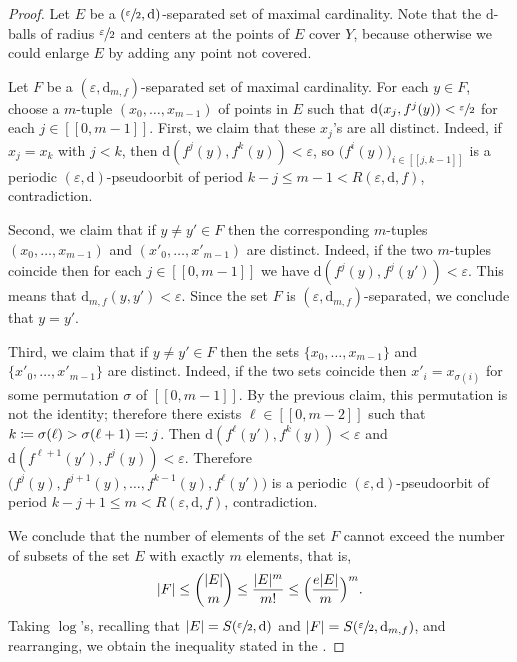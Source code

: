 \documentclass[JEP,XML,SOM,Unicode]{cedram}
\newcommand{\ldbrack}{[\![}
\newcommand{\rdbrack}{]\!]}
\def\vcentcolon{\mathrel{\mathop\ordinarycolon}}
\providecommand\ordinarycolon{:}
\providecommand*\coloneqq{\vcentcolon\mathrel{\mkern-1.2mu}=}
\providecommand*\eqqcolon{=\mathrel{\mkern-1.2mu}\vcentcolon}
\let\eqcolon\eqqcolon
\theoremstyle{plain}
\theoremstyle{definition}
\newcommand{\dd}{\mathrm{d}}
\let\epsilon\varepsilon
\begin{document}
\begin{proof}	
Let $E$ be a $(\sfrac{\epsilon}{2},\dd)$-separated set of maximal cardinality.
Note that the $\dd$-balls of radius $\sfrac{\epsilon}{2}$ and centers at the points of $E$ cover $Y$, because otherwise we could enlarge $E$ by adding any point not covered.

Let $F$ be a $(\epsilon,\dd_{m,f})$-separated set of maximal cardinality.
For each $y \in F$, choose a $m$-tuple $(x_0, \dots, x_{m-1})$ of points in $E$ such that $\dd(x_j, f^j(y)) < \sfrac{\epsilon}{2}$ for each $j \in \ldbrack 0, m-1 \rdbrack$.
First, we claim that these $x_j$'s are all distinct. Indeed, if $x_j = x_k$ with $j < k$, then $\dd(f^j(y), f^k(y)) < \epsilon$, so $\big( f^i(y) \big)_{i \in \ldbrack j, k-1 \rdbrack}$ is a periodic $(\epsilon,\dd)$-pseudoorbit of period $k-j \le m-1 < R(\epsilon,\dd,f)$, contradiction.

Second, we claim that if $y \neq y' \in F$ then the corresponding $m$-tuples $(x_0, \dots, x_{m-1})$ and $(x'_0, \dots, x'_{m-1})$ are distinct.
Indeed, if the two $m$-tuples coincide then for each $j \in \ldbrack 0, m-1\rdbrack$ we have $\dd(f^j(y), f^j(y')) < \epsilon$. This means that $\dd_{m,f}(y,y') < \epsilon$. Since the set $F$ is $(\epsilon,\dd_{m,f})$-separated, we conclude that $y=y'$.

Third, we claim that if $y \neq y' \in F$ then the sets $\{x_0, \dots, x_{m-1}\}$ and $\{x'_0, \dots, x'_{m-1}\}$ are distinct.
Indeed, if the two sets coincide then $x'_i = x_{\sigma(i)}$ for some permutation $\sigma$ of $\ldbrack 0, m-1\rdbrack$.
By the previous claim, this permutation is not the identity; therefore there exists $\ell \in \ldbrack 0, m-2\rdbrack$ such that $k \coloneqq \sigma(\ell) > \sigma(\ell+1) \eqcolon j$. Then $\dd(f^{\ell}(y'), f^{k}(y)) < \epsilon$ and $\dd(f^{\ell+1}(y'), f^{j}(y)) < \epsilon$.
Therefore $\big(f^{j}(y), f^{j+1}(y), \dots, f^{k-1}(y), f^{\ell}(y') \big)$
is a periodic $(\epsilon,\dd)$-pseudoorbit of period $k-j+1 \le m < R(\epsilon,\dd,f)$, contradiction.

We conclude that the number of elements of the set $F$ cannot exceed the number of subsets of the set $E$ with exactly $m$ elements, that is,
\[
|F| \le \binom{|E|}{m} \le \frac{|E|^m}{m!} \le \Bigl( \frac{e |E|}{m} \Bigr)^m.
\]
Taking $\log$'s, recalling that $|E| = S(\sfrac{\epsilon}{2},\dd)$ and $|F| = S(\sfrac{\epsilon}{2},\dd_{m,f})$, and rearranging, we obtain the inequality stated in the .
\end{proof}
\end{document}
